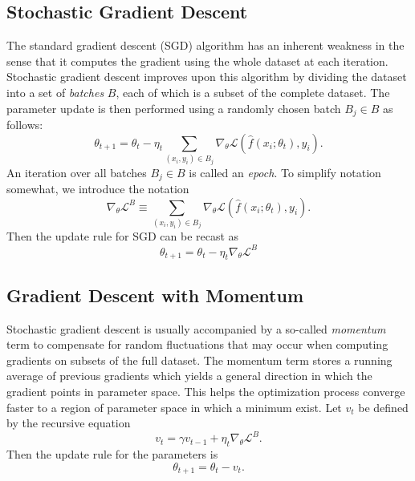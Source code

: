 \subsection{Stochastic Gradient Descent}
The standard gradient descent (SGD) algorithm has an inherent weakness in the sense that it computes the gradient using the whole dataset
at each iteration. Stochastic gradient descent improves upon this algorithm by dividing the dataset into a set of \textit{batches} $B$,
each of which is a subset of the complete dataset. The parameter update is then performed using a randomly chosen batch $B_j \in B$ as follows:
\begin{equation}
	\theta_{t+1} = \theta_t - \eta_t \sum_{(x_i, y_i) \in B_j} \nabla_\theta \mathcal{L}(\hat{f}(x_i; \theta_t), y_i).
\end{equation}
An iteration over all batches $B_j \in B$ is called an \textit{epoch}. To simplify notation somewhat, we introduce the notation
\begin{equation}
	\nabla_\theta \mathcal{L}^{B} \equiv \sum_{(x_i, y_i) \in B_j} \nabla_\theta \mathcal{L}(\hat{f}(x_i; \theta_t), y_i).
\end{equation}
Then the update rule for SGD can be recast as
\begin{equation}
	\theta_{t+1} = \theta_t - \eta_t \nabla_\theta \mathcal{L}^{B}
\end{equation}


\subsection{Gradient Descent with Momentum}
Stochastic gradient descent is usually accompanied by a so-called \textit{momentum} term to compensate for random
fluctuations that may occur when computing gradients on subsets of the full dataset. The momentum term stores a running average of
previous gradients which yields a general direction in which the gradient points in parameter space. 
This helps the optimization process converge faster to a region of parameter space in which a minimum exist.
Let $v_t$ be defined by the recursive equation 
\begin{equation}
	v_t = \gamma v_{t-1} + \eta_t \nabla_\theta \mathcal{L}^{B}.
\end{equation}
Then the update rule for the parameters is
\begin{equation}
	\theta_{t+1} = \theta_t - v_t.
\end{equation}

